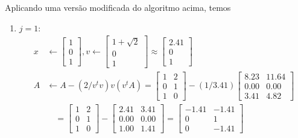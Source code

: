\begin{questions}
\begin{parts}
\begin{solution}
            Aplicando uma vers\~{a}o modificada do algoritmo acima, temos
            \begin{enumerate}
                \item $j = 1$:
                    \begin{align*}
                        x &\leftarrow \begin{bmatrix}
                            1 \\
                            0 \\
                            1
                        \end{bmatrix}, v \leftarrow \begin{bmatrix}
                            1 + \sqrt{2} \\
                            0 \\
                            1
                        \end{bmatrix} \approx \begin{bmatrix}
                            2.41 \\
                            0 \\
                            1
                        \end{bmatrix}\\
                        A &\leftarrow A - (2 / v^t v) v (v^t A) = \begin{bmatrix}
                            1 & 2 \\
                            0 & 1 \\
                            1 & 0
                        \end{bmatrix} -  (1 / 3.41) \begin{bmatrix}
                            8.23 & 11.64 \\
                            0.00 & 0.00 \\
                            3.41 & 4.82
                        \end{bmatrix} \\
                        &\quad = \begin{bmatrix}
                            1 & 2 \\
                            0 & 1 \\
                            1 & 0
                        \end{bmatrix} -  \begin{bmatrix}
                            2.41 & 3.41 \\
                            0.00 & 0.00 \\
                            1.00 & 1.41
                        \end{bmatrix}  = \begin{bmatrix}
                            -1.41 & - 1.41 \\
                            0 & 1 \\
                            0 & - 1.41
                        \end{bmatrix}
                    \end{align*}


\end{enumerate}
\end{solution}
\end{parts}
\end{questions}
